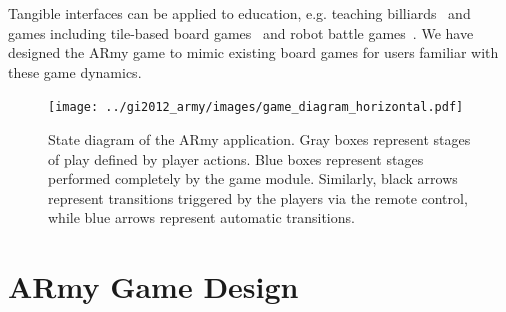 \documentclass[10pt,twocolumn,letterpaper]{article}
\begin{document}
Tangible interfaces can be applied to education, e.g. teaching
billiards~\cite{Suganuma:2008:BIS:1501750.1501752} and games including
%
%
%
tile-based board games~\cite{Rooke:2010:PDT:1709886.1709932} and
%
robot battle games~\cite{KOJIMA:2006:ACA:1109723.1110608}.
%
%
%
%
%
%
%
We have designed the ARmy game to mimic existing board games for
users familiar with these game dynamics.


\begin{figure}[t]
\begin{center}
\texttt{[image: ../gi2012\_army/images/game\_diagram\_horizontal.pdf]}
\end{center}
\vspace*{-0.05in}
\caption[ARmy Application State Diagram]{State diagram of the
    ARmy application.  Gray boxes represent stages of play defined by
    player actions.  Blue boxes represent stages performed completely
    by the game module.  Similarly, black arrows represent transitions
    triggered by the players via the remote control, while blue arrows
    represent automatic transitions.}
\label{FIGURE:ARmyDiagram}
\vspace{-0.1in}
\end{figure}



\section{ARmy Game Design}
\end{document}
